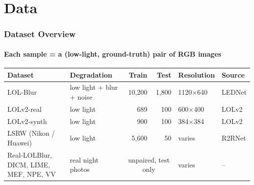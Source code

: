 \section{Data}

\begin{frame}
    \frametitle{Dataset Overview}
    \framesubtitle{Each sample = a (low-light, ground-truth) pair of RGB images}

    \begin{center}
    \scriptsize
    \begin{tabular}{llrrll}
        \toprule
        \textbf{Dataset} & \textbf{Degradation} & \textbf{Train} & \textbf{Test} & \textbf{Resolution} & \textbf{Source} \\
        \midrule
        LOL-Blur     & low light + blur + noise & 10{,}200 & 1{,}800 & 1120$\times$640 & LEDNet \\
        LOLv2-real   & low light        & 689      & 100     & 600$\times$400 & LOLv2 \\
        LOLv2-synth  & low light        & 900      & 100     & 384$\times$384 & LOLv2 \\
        LSRW (Nikon / Huawei) & low light & 5{,}600 & 50   & varies & R2RNet \\
        \midrule
        Real-LOLBlur, DICM, LIME, MEF, NPE, VV & real night photos & \multicolumn{2}{c}{unpaired, test only} & varies & -- \\
        \bottomrule
    \end{tabular}
    \end{center}


\end{frame}
